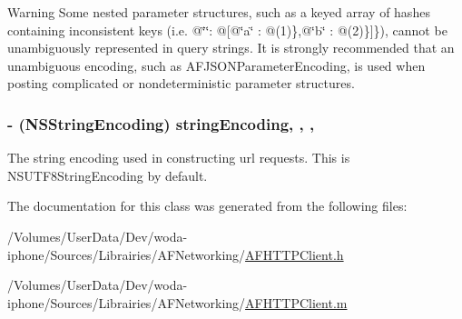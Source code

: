 \begin{DoxyWarning}{Warning}
Some nested parameter structures, such as a keyed array of hashes containing inconsistent keys (i.\-e. {\ttfamily @\char`\"{}\char`\"{}\-: @\mbox{[}@\char`\"{}a\char`\"{} \-: @(1)\},@\char`\"{}b\char`\"{} \-: @(2)\}\mbox{]}\}}), cannot be unambiguously represented in query strings. It is strongly recommended that an unambiguous encoding, such as {\ttfamily A\-F\-J\-S\-O\-N\-Parameter\-Encoding}, is used when posting complicated or nondeterministic parameter structures. 
\end{DoxyWarning}
\hypertarget{interface_a_f_h_t_t_p_client_a77951c40c6ec24f1c041544a105245c8}{
\subsubsection[{string\-Encoding}]{\setlength{\rightskip}{0pt plus 5cm}-\/ (N\-S\-String\-Encoding) string\-Encoding\hspace{0.3cm}{\ttfamily [read]}, {\ttfamily [write]}, {\ttfamily [nonatomic]}, {\ttfamily [assign]}}}\label{interface_a_f_h_t_t_p_client_a77951c40c6ec24f1c041544a105245c8}
The string encoding used in constructing url requests. This is {\ttfamily N\-S\-U\-T\-F8\-String\-Encoding} by default. 

The documentation for this class was generated from the following files\-:\begin{DoxyCompactItemize}
\item 
/\-Volumes/\-User\-Data/\-Dev/woda-\/iphone/\-Sources/\-Librairies/\-A\-F\-Networking/\hyperlink{_a_f_h_t_t_p_client_8h}{A\-F\-H\-T\-T\-P\-Client.\-h}\item 
/\-Volumes/\-User\-Data/\-Dev/woda-\/iphone/\-Sources/\-Librairies/\-A\-F\-Networking/\hyperlink{_a_f_h_t_t_p_client_8m}{A\-F\-H\-T\-T\-P\-Client.\-m}\end{DoxyCompactItemize}
